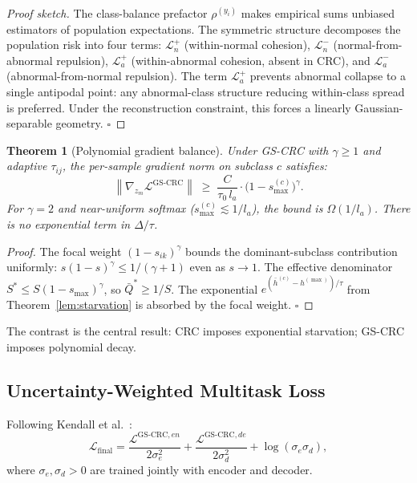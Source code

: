 \documentclass[conference]{IEEEtran}
\newtheorem{theorem}{Theorem}
\begin{document}
\begin{proof}[Proof sketch]
The class-balance prefactor $\rho^{(y_i)}$ makes empirical sums unbiased
estimators of population expectations. The symmetric structure decomposes
the population risk into four terms:
$\mathcal{L}_n^+$ (within-normal cohesion),
$\mathcal{L}_n^-$ (normal-from-abnormal repulsion),
$\mathcal{L}_a^+$ (within-abnormal cohesion, absent in CRC), and
$\mathcal{L}_a^-$ (abnormal-from-normal repulsion).
The term $\mathcal{L}_a^+$ prevents abnormal collapse to a single antipodal
point: any abnormal-class structure reducing within-class spread is preferred.
Under the reconstruction constraint, this forces a linearly
Gaussian-separable geometry. $\square$
\end{proof}

\begin{theorem}[Polynomial gradient balance]\label{thm:balance}
Under GS-CRC with $\gamma \ge 1$ and adaptive $\tau_{ij}$, the per-sample
gradient norm on subclass $c$ satisfies:
\begin{equation}
\left\|\nabla_{z_m}\mathcal{L}^{\text{GS-CRC}}\right\|
\;\ge\;
\frac{C}{\tau_0\,l_a}
\cdot\bigl(1 - s^{(c)}_{\max}\bigr)^\gamma.
\label{eq:balance}
\end{equation}
For $\gamma=2$ and near-uniform softmax ($s^{(c)}_{\max} \lesssim 1/l_a$),
the bound is $\Omega(1/l_a)$. There is \emph{no exponential term in $\Delta/\tau$}.
\end{theorem}

\begin{proof}
The focal weight $(1-s_{ik})^\gamma$ bounds the dominant-subclass contribution
uniformly: $s(1-s)^\gamma \le 1/(\gamma+1)$ even as $s \to 1$.
The effective denominator $S^* \le S(1-s_{\max})^\gamma$, so
$\bar{Q}^* \ge 1/S$. The exponential $e^{(\bar{h}^{(c)}-h^{(\max)})/\tau}$
from Theorem~\ref{lem:starvation} is absorbed by the focal weight. $\square$
\end{proof}

The contrast is the central result: CRC imposes exponential starvation;
GS-CRC imposes polynomial decay.

\subsection{Uncertainty-Weighted Multitask Loss}

Following Kendall et al.~\cite{kendall2018multi}:
\begin{equation}
\mathcal{L}_{\text{final}}
= \frac{\mathcal{L}^{\text{GS-CRC},en}}{2\sigma_e^2}
+ \frac{\mathcal{L}^{\text{GS-CRC},de}}{2\sigma_d^2}
+ \log(\sigma_e\sigma_d),
\label{eq:uw}
\end{equation}
where $\sigma_e, \sigma_d > 0$ are trained jointly with encoder and decoder.
\end{document}
